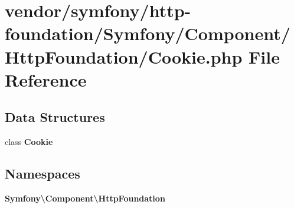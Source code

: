 \section{vendor/symfony/http-\/foundation/\+Symfony/\+Component/\+Http\+Foundation/\+Cookie.php File Reference}
\label{symfony_2http-foundation_2_symfony_2_component_2_http_foundation_2_cookie_8php}
\subsection*{Data Structures}
\begin{DoxyCompactItemize}
\item 
class {\bf Cookie}
\end{DoxyCompactItemize}
\subsection*{Namespaces}
\begin{DoxyCompactItemize}
\item 
 {\bf Symfony\textbackslash{}\+Component\textbackslash{}\+Http\+Foundation}
\end{DoxyCompactItemize}
